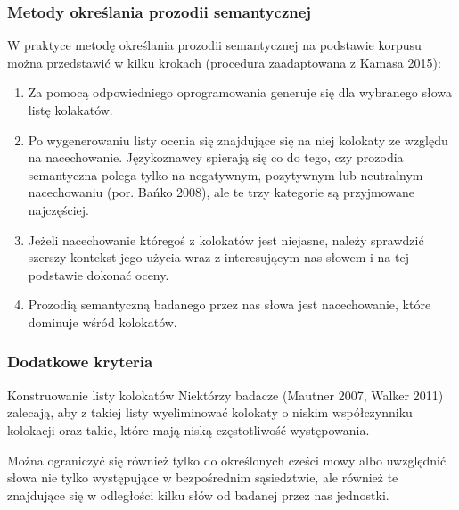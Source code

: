 \documentclass[11pt]{beamer}
\begin{document}
\begin{frame}
  \frametitle{Metody określania prozodii semantycznej}
  W praktyce metodę określania prozodii semantycznej na podstawie korpusu można przedstawić w kilku krokach (procedura zaadaptowana z Kamasa 2015): 
  \begin{enumerate}
  \item Za pomocą odpowiedniego oprogramowania generuje się dla wybranego słowa listę kolakatów.
  \item Po wygenerowaniu listy ocenia się znajdujące się na niej kolokaty ze względu na nacechowanie. Językoznawcy spierają się co do tego, czy prozodia semantyczna polega tylko na negatywnym, pozytywnym lub neutralnym nacechowaniu (por. Bańko 2008), ale te trzy kategorie są przyjmowane najczęściej.
  \item Jeżeli nacechowanie któregoś z kolokatów jest niejasne, należy sprawdzić szerszy kontekst jego użycia wraz z interesującym nas słowem i na tej podstawie dokonać oceny.
  \item Prozodią semantyczną badanego przez nas słowa jest nacechowanie, które dominuje wśród kolokatów.
  \end{enumerate}
\end{frame}

\begin{frame}
  \frametitle{Dodatkowe kryteria}
  \begin{block}{Konstruowanie listy kolokatów}
    Niektórzy badacze (Mautner 2007, Walker 2011) zalecają, aby z takiej listy wyeliminować kolokaty o niskim współczynniku kolokacji oraz takie, które mają niską częstotliwość występowania.

    Można ograniczyć się również tylko do określonych cześci mowy albo uwzględnić słowa nie tylko występujące w bezpośrednim sąsiedztwie, ale również  te znajdujące się w odległości kilku słów od badanej przez nas jednostki.
  \end{block}
\end{frame}

\begin{frame}
  \Huge

\end{frame}
\end{document}
